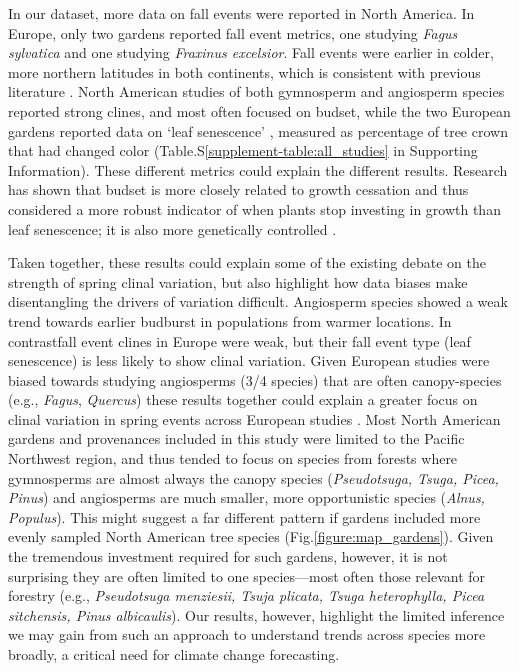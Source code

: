 \documentclass[12pt]{article}
\providecommand{\DIFaddtex}[1]{{\protect\color{blue}\uwave{#1}}} %
\providecommand{\DIFaddbegin}{} %
\providecommand{\DIFaddend}{} %
\providecommand{\DIFadd}[1]{\texorpdfstring{\DIFaddtex{#1}}{#1}} %
\newcommand{\DIFaddincludegraphics}[2][]{{\color{blue}\fbox{\DIFOincludegraphics[#1]{#2}}}} %
\DeclareRobustCommand{\DIFaddbegin}{\DIFOaddbegin \let\includegraphics\DIFaddincludegraphics} %
\DeclareRobustCommand{\DIFaddend}{\DIFOaddend \let\includegraphics\DIFOincludegraphics} %
\begin{document}
In our dataset, more data on fall events were reported in North America. In Europe, only two gardens reported fall event metrics, one studying \emph{Fagus sylvatica} and one studying \emph{Fraxinus excelsior}. Fall events were earlier in colder, more northern latitudes in both continents, which is consistent with previous literature \citep{AitkenBemmels16, Alberto13}. North American studies of both gymnosperm and angiosperm species reported strong clines, and most often focused on budset, while the two European gardens reported data on `leaf senescence' \citep{rosique22}, measured as percentage of tree crown that had changed color (Table.S\ref{supplement-table:all_studies} in Supporting Information). These different metrics could explain the different results. Research has shown that budset is more closely related to growth cessation and thus considered a more robust indicator of when plants stop investing in growth than leaf senescence; it is also more genetically controlled \citep[with different photoperiod thresholds required to trigger budset in different provenances,][]{Alberto13}. 

Taken together, these results could explain some of the existing debate on the strength of spring clinal variation, but also highlight how data biases make disentangling the drivers of variation difficult. Angiosperm species showed a weak trend towards earlier budburst in populations from warmer locations. In contrast\DIFaddbegin \DIFadd{, }\DIFaddend fall event clines in Europe were weak, but their fall event type (leaf senescence) is less likely to show clinal variation. Given European studies were biased towards studying angiosperms (3/4 species) that are often canopy-species (e.g., \emph{Fagus}, \emph{Quercus}) these results together could explain a greater focus on clinal variation in spring events across European studies \citep{Basler:2012,gauzere2020,sog08,deans96,von95}. Most North American gardens and provenances included in this study were limited to the Pacific Northwest region, and thus tended to focus on species from forests where gymnosperms are almost always the canopy species (\emph{Pseudotsuga, Tsuga, Picea, Pinus}) and angiosperms are much smaller, more opportunistic species (\emph{Alnus, Populus}). This might suggest a far different pattern if gardens included more evenly sampled North American tree species (Fig.\ref{figure:map_gardens}). Given the tremendous investment required for such gardens, however, it is not surprising they are often limited to one species---most often those relevant for forestry (e.g., \emph{Pseudotsuga menziesii, Tsuja plicata, Tsuga heterophylla, Picea sitchensis, Pinus albicaulis}). Our results, however, highlight the limited inference we may gain from such an approach to understand trends across species more broadly, a critical need for climate change forecasting.
\end{document}
